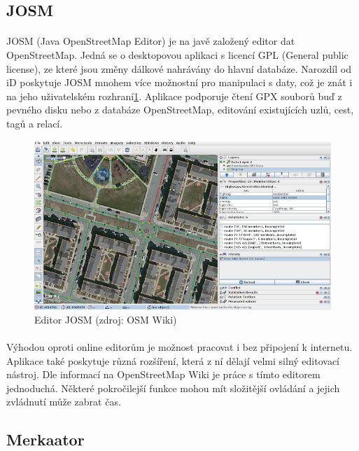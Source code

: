 \documentclass[11pt,a4paper,titlepage,oneside]{book}
\begin{document}
		\subsection{JOSM}
			\paragraph{}JOSM (Java OpenStreetMap Editor) je na javě založený editor dat OpenStreetMap. Jedná se o desktopovou aplikaci s licencí GPL (General public license), ze které jsou změny dálkové nahrávány do hlavní databáze. Narozdíl od iD poskytuje JOSM mnohem více možnostní pro manipulaci s daty, což je znát i na jeho uživatelském rozhraní\ref{fig:josm_osm}. Aplikace podporuje čtení GPX souborů buď z pevného disku nebo z databáze OpenStreetMap, editování existujících uzlů, cest, tagů a relací.
		\begin{figure}[!h]
			\begin{center}
				\includegraphics[width=12cm]{obrazky/josm_osm.png}
				\caption{Editor JOSM (zdroj: OSM Wiki\cite{wiki_josm})}
				\label{fig:josm_osm}
			\end{center}
		\end{figure}
			\paragraph{} Výhodou oproti online editorům je možnost pracovat i bez připojení k internetu. Aplikace také poskytuje různá rozšíření, která z ní dělají velmi silný editovací nástroj. Dle informací na OpenStreetMap Wiki\cite{wiki_josm} je práce s tímto editorem jednoduchá. Některé pokročilejší funkce mohou mít složitější ovládání a jejich zvládnutí může zabrat čas.

		\subsection{Merkaator}
\end{document}
